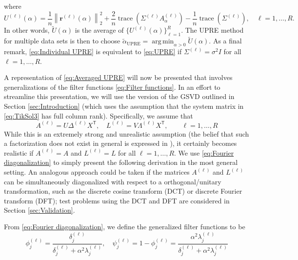 \documentclass[12pt]{article}
\newcommand{\rVec}{\mathbf{r}}	%
\newcommand{\trans}[1]{{#1}^\mathsf{T}}	%
\DeclareMathOperator{\trace}{trace}		%
\newcommand{\regparam}{\alpha}
\DeclareMathOperator*{\argmin}{arg\,min}
\newcommand{\filt}{\phi}
\newcommand{\mfilt}{\psi}
\newcommand{\noiseSD}{\sigma}	%
\newcommand{\U}{U}	%
\begin{document}
where
\begin{equation}
\label{eq:Individual UPRE}
\U^{(\ell)}(\regparam) = \frac{1}{n}\left\|\rVec^{(\ell)}(\regparam)\right\|_2^2 + \frac{2}{n} \trace\left(\Sigma^{(\ell)} A_\regparam^{(\ell)}\right) - \frac{1}{n} \trace\left(\Sigma^{(\ell)}\right), \quad \ell = 1,\ldots,R.
\end{equation}
In other words, $\widetilde{\U}(\regparam)$ is the average of $\{\U^{(\ell)}(\regparam)\}_{\ell=1}^R$. The UPRE method for multiple data sets is then to choose $\widetilde{\regparam}_{\textrm{UPRE}} = \argmin_{\regparam > 0} \widetilde{\U}(\regparam)$. As a final remark, \eqref{eq:Individual UPRE} is equivalent to \eqref{eq:UPRE} if $\Sigma^{(\ell)} = \noiseSD^2 I$ for all $\ell = 1,\ldots,R$. \par
A representation of \eqref{eq:Averaged UPRE} will now be presented that involves generalizations of the filter functions \eqref{eq:Filter functions}. In an effort to streamline this presentation, we will use the version of the GSVD outlined in Section \ref{sec:Introduction} (which uses the assumption that the system matrix in \eqref{eq:TikSol3} has full column rank). Specifically, we assume that
\begin{equation}
\label{eq:Fourier diagonalization}
A^{(\ell)} = U{\Delta^{(\ell)}}\trans{X}, \quad L^{(\ell)} = V{\Lambda^{(\ell)}}\trans{X}, \qquad \ell = 1,\ldots,R
\end{equation}
While this is an extremely strong and unrealistic assumption (the belief that such a factorization does not exist in general is expressed in \cite{Brezinski2003}), it certainly becomes realistic if $A^{(\ell)} = A$ and $L^{(\ell)} = L$ for all $\ell = 1,\ldots,R$. We use \eqref{eq:Fourier diagonalization} to simply present the following derivation in the most general setting. An analogous approach could be taken if the matrices $A^{(\ell)}$ and $L^{(\ell)}$ can be simultaneously diagonalized with respect to a orthogonal/unitary transformation, such as the discrete cosine transform (DCT) or discrete Fourier transform (DFT); test problems using the DCT and DFT are considered in Section \ref{sec:Validation}. \par
From \eqref{eq:Fourier diagonalization}, we define the generalized filter functions to be
\begin{equation}
\label{eq:Filter functions 2}
\filt^{(\ell)}_j = \frac{\delta^{(\ell)}_j}{\delta^{(\ell)}_j + \regparam^2 \lambda^{(\ell)}_j}, \quad \mfilt^{(\ell)}_j = 1 - \filt^{(\ell)}_j = \frac{\regparam^2 \lambda^{(\ell)}_j}{\delta^{(\ell)}_j + \regparam^2 \lambda^{(\ell)}_j}
\end{equation}
\end{document}
